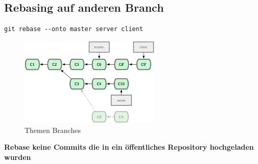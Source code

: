 \subsection{Rebasing auf anderen Branch}
\begin{lstlisting}[caption={Rebase auf anderen Branch},captionpos=b]
git rebase --onto master server client
\end{lstlisting}
\begin{figure}[ht]
	\centering
		\includegraphics[width=0.6\textwidth]{img/rebase.png}
	\caption{Themen Branches}
\end{figure}
\textbf{Rebase keine Commits die in ein öffentliches Repository hochgeladen wurden}

